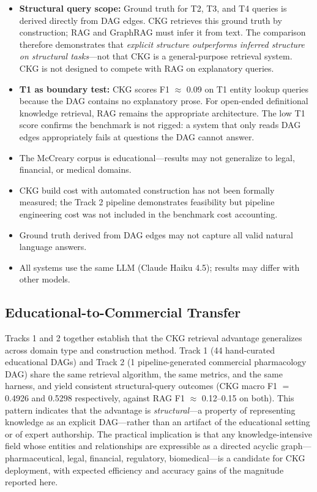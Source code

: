 \begin{itemize}
  \item \textbf{Structural query scope:} Ground truth for T2, T3, and T4 queries
    is derived directly from DAG edges. CKG retrieves this ground truth by
    construction; RAG and GraphRAG must infer it from text. The comparison
    therefore demonstrates that \emph{explicit structure outperforms inferred
    structure on structural tasks}---not that CKG is a general-purpose
    retrieval system. CKG is not designed to compete with RAG on explanatory
    queries.
  \item \textbf{T1 as boundary test:} CKG scores F1 $\approx$ 0.09 on T1
    entity lookup queries because the DAG contains no explanatory prose. For
    open-ended definitional knowledge retrieval, RAG remains the appropriate
    architecture. The low T1 score confirms the benchmark is not rigged: a
    system that only reads DAG edges appropriately fails at questions the DAG
    cannot answer.
  \item The McCreary corpus is educational---results may not generalize to
    legal, financial, or medical domains.
  \item CKG build cost with automated construction has not been formally
    measured; the Track 2 pipeline demonstrates feasibility but pipeline
    engineering cost was not included in the benchmark cost accounting.
  \item Ground truth derived from DAG edges may not capture all valid
    natural language answers.
  \item All systems use the same LLM (Claude Haiku 4.5); results may
    differ with other models.
\end{itemize}

\subsection{Educational-to-Commercial Transfer}\label{sec:disc-transfer}

Tracks 1 and 2 together establish that the CKG retrieval advantage
generalizes across domain type and construction method. Track 1
(44 hand-curated educational DAGs) and Track 2 (1 pipeline-generated
commercial pharmacology DAG) share the same retrieval algorithm, the
same metrics, and the same harness, and yield consistent structural-query
outcomes (CKG macro F1 $=$ 0.4926 and 0.5298 respectively, against
RAG F1 $\approx$ 0.12--0.15 on both). This pattern indicates that the
advantage is \emph{structural}---a property of representing knowledge
as an explicit DAG---rather than an artifact of the educational setting
or of expert authorship. The practical implication is that any
knowledge-intensive field whose entities and relationships are
expressible as a directed acyclic graph---pharmaceutical, legal,
financial, regulatory, biomedical---is a candidate for CKG deployment,
with expected efficiency and accuracy gains of the magnitude reported
here.
